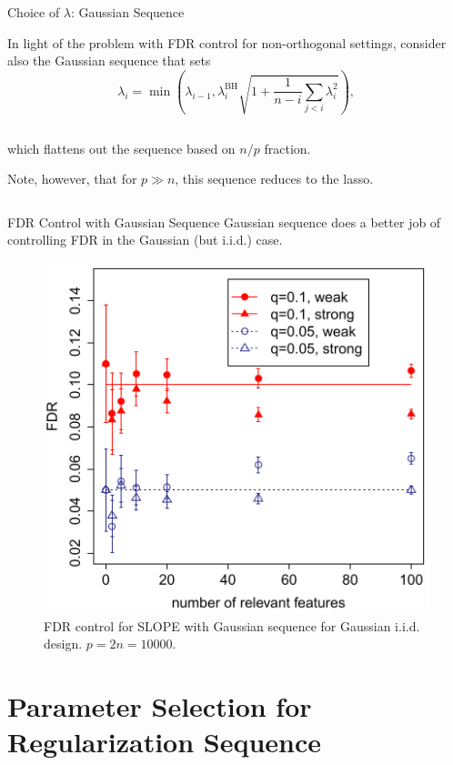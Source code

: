 \documentclass[10pt]{beamer}
\begin{document}
\begin{frame}{Choice of \(\lambda\): Gaussian Sequence}

In light of the problem with FDR control for non-orthogonal settings, \textcite{bogdan2015} consider also the \alert{Gaussian} sequence that sets
\[\lambda_i = \min\left(\lambda_{i-1}, \lambda^{\mathrm{BH}}_i\sqrt{1 + \frac{1}{n-i} \sum_{j < i}\lambda_i^2}\right),\]

\begin{columns}[T]
\begin{column}{0.35\linewidth}
which flattens out the sequence based on $n/p$ fraction.\medskip

Note, however, that for \(p \gg n\), this sequence reduces to the lasso.
\end{column}
\begin{column}{0.55\linewidth}
    \begin{figure}
    \centering
    
\end{figure}
\end{column}
\end{columns}

\end{frame}

\begin{frame}{FDR Control with Gaussian Sequence}
    Gaussian sequence does a better job of controlling FDR in the Gaussian (but i.i.d.) case.
    
    \begin{figure}
        \centering
        \includegraphics[width=0.5\linewidth]{figures/bogdan-fig7.png}
        \caption{FDR control for SLOPE with Gaussian sequence for Gaussian i.i.d. design. \(p = 2n = 10000\).}
    \end{figure}
\end{frame}

\section{Parameter Selection for Regularization Sequence}
\end{document}
